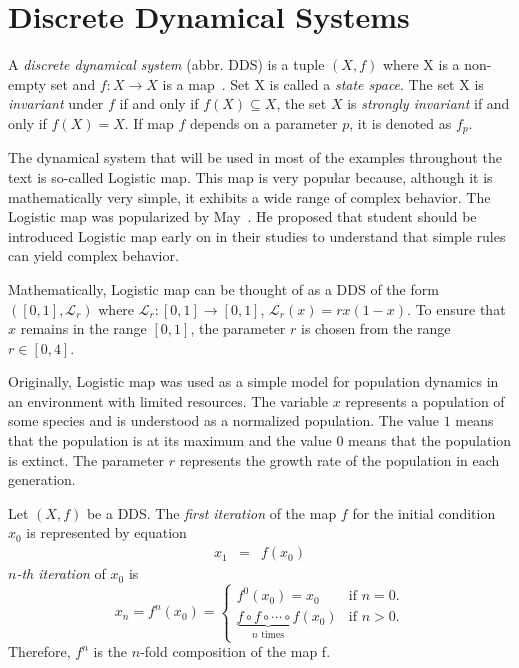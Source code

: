 \section{Discrete Dynamical Systems}

\begin{definition}
    A \emph{discrete dynamical system} (abbr. DDS) is a tuple $\left( X, f \right)$ where X is a non-empty set and $f: X \rightarrow X$ is a map~\cite{Brin20100706}.
    Set X is called a \emph{state space}.
    The set X is \emph{ invariant} under $f$ if and only if $f(X) \subseteq X$, the set $X$ is \emph{strongly invariant} if and only if $f(X) = X$.
    If map $f$ depends on a parameter $p$, it is denoted as $f_p$.
\end{definition}

\begin{remark}
    The dynamical system that will be used in most of the examples throughout the text is so-called Logistic map.
    This map is very popular because, although it is mathematically very simple, it exhibits a wide range of complex behavior.
    The Logistic map was popularized by May~\cite{May19760610}.
    He proposed that student should be introduced Logistic map early on in their studies to understand that simple rules can yield complex behavior.
    \par
    Mathematically, Logistic map can be thought of as a DDS of the form $\left( [0, 1], \mathcal{L}_{r} \right)$ where $\mathcal{L}_{r}: [0,1] \rightarrow [0,1]$, $\mathcal{L}_{r}(x) = rx(1-x)$.
    To ensure that $x$ remains in the range $[0,1]$, the parameter $r$ is chosen from the range $r \in [0, 4]$.
    \par
    Originally, Logistic map was used as a simple model for population dynamics in an environment with limited resources.
    The variable $x$ represents a population of some species and is understood as a normalized population.
    The value $1$ means that the population is at its maximum and the value $0$ means that the population is extinct.
    The parameter $r$ represents the growth rate of the population in each generation. \cite{Strogatz201854}
\end{remark}

\begin{definition}
    Let $\left( X, f \right)$ be a DDS. 
    The \emph{first iteration} of the map $f$ for the initial condition $x_0$ is represented by equation
    \begin{eqnarray}
        x_{1}  & = & f(x_{0})
    \end{eqnarray}
    \emph{$n$-th iteration} of $x_0$ is
    \begin{equation}
    x_{n} = f^{n}(x_0) =
        \begin{cases}
            f^{0}(x_0) = x_0 & \text{if } n = 0. \\
            \underbrace{f \circ f \circ \cdots \circ f}_\text{$n$ times}(x_0) & \text{if } n > 0. 
        \end{cases}
    \end{equation}
    Therefore, $f^{n}$ is the $n$-fold composition of the map f.
\end{definition}

